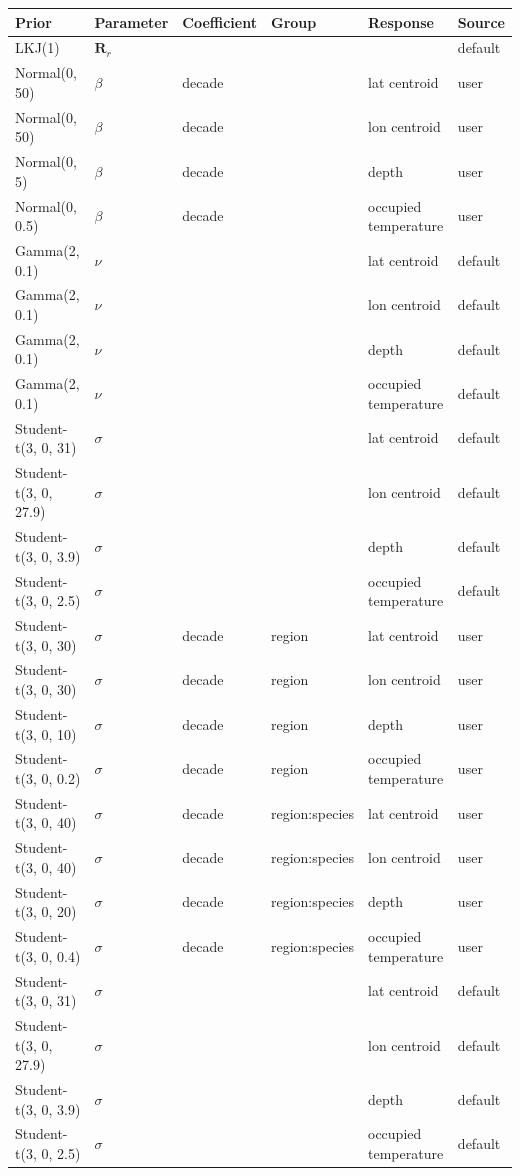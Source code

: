 
\begin{tabular}{llllll}
\toprule
Prior & Parameter & Coefficient & Group & Response & Source\\
\midrule
LKJ(1) & $\mathbf{R}_{r}$ &  &  &  & default\\
Normal(0, 50) & $\beta$ & decade &  & lat centroid & user\\
Normal(0, 50) & $\beta$ & decade &  & lon centroid & user\\
Normal(0, 5) & $\beta$ & decade &  & depth & user\\
Normal(0, 0.5) & $\beta$ & decade &  & occupied temperature & user\\
Gamma(2, 0.1) & $\nu$ &  &  & lat centroid & default\\
Gamma(2, 0.1) & $\nu$ &  &  & lon centroid & default\\
Gamma(2, 0.1) & $\nu$ &  &  & depth & default\\
Gamma(2, 0.1) & $\nu$ &  &  & occupied temperature & default\\
Student-t(3, 0, 31) & $\sigma$ &  &  & lat centroid & default\\
Student-t(3, 0, 27.9) & $\sigma$ &  &  & lon centroid & default\\
Student-t(3, 0, 3.9) & $\sigma$ &  &  & depth & default\\
Student-t(3, 0, 2.5) & $\sigma$ &  &  & occupied temperature & default\\
Student-t(3, 0, 30) & $\sigma$ & decade & region & lat centroid & user\\
Student-t(3, 0, 30) & $\sigma$ & decade & region & lon centroid & user\\
Student-t(3, 0, 10) & $\sigma$ & decade & region & depth & user\\
Student-t(3, 0, 0.2) & $\sigma$ & decade & region & occupied temperature & user\\
Student-t(3, 0, 40) & $\sigma$ & decade & region:species & lat centroid & user\\
Student-t(3, 0, 40) & $\sigma$ & decade & region:species & lon centroid & user\\
Student-t(3, 0, 20) & $\sigma$ & decade & region:species & depth & user\\
Student-t(3, 0, 0.4) & $\sigma$ & decade & region:species & occupied temperature & user\\
Student-t(3, 0, 31) & $\sigma$ &  &  & lat centroid & default\\
Student-t(3, 0, 27.9) & $\sigma$ &  &  & lon centroid & default\\
Student-t(3, 0, 3.9) & $\sigma$ &  &  & depth & default\\
Student-t(3, 0, 2.5) & $\sigma$ &  &  & occupied temperature & default\\
\bottomrule
\end{tabular}
